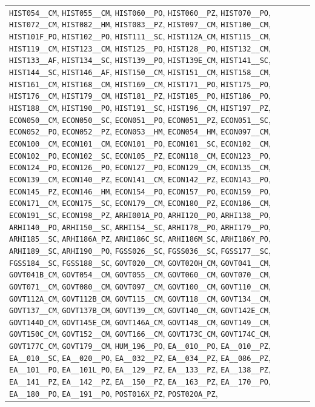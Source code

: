 \begin{longtable}{|p{4.4in}|p{4.4in}|}
\verb|HIST054__CM|, \verb|HIST055__CM|, \verb|HIST060__PO|, \verb|HIST060__PZ|, \verb|HIST070__PO|, \verb|HIST072__CM|, \verb|HIST082__HM|, \verb|HIST083__PZ|, \verb|HIST097__CM|, \verb|HIST100__CM|, \verb|HIST101F_PO|, \verb|HIST102__PO|, \verb|HIST111__SC|, \verb|HIST112A_CM|, \verb|HIST115__CM|, \verb|HIST119__CM|, \verb|HIST123__CM|, \verb|HIST125__PO|, \verb|HIST128__PO|, \verb|HIST132__CM|, \verb|HIST133__AF|, \verb|HIST134__SC|, \verb|HIST139__PO|, \verb|HIST139E_CM|, \verb|HIST141__SC|, \verb|HIST144__SC|, \verb|HIST146__AF|, \verb|HIST150__CM|, \verb|HIST151__CM|, \verb|HIST158__CM|, \verb|HIST161__CM|, \verb|HIST168__CM|, \verb|HIST169__CM|, \verb|HIST171__PO|, \verb|HIST175__PO|, \verb|HIST176__CM|, \verb|HIST179__CM|, \verb|HIST181__PZ|, \verb|HIST185__PO|, \verb|HIST186__PO|, \verb|HIST188__CM|, \verb|HIST190__PO|, \verb|HIST191__SC|, \verb|HIST196__CM|, \verb|HIST197__PZ|, \verb|ECON050__CM|, \verb|ECON050__SC|, \verb|ECON051__PO|, \verb|ECON051__PZ|, \verb|ECON051__SC|, \verb|ECON052__PO|, \verb|ECON052__PZ|, \verb|ECON053__HM|, \verb|ECON054__HM|, \verb|ECON097__CM|, \verb|ECON100__CM|, \verb|ECON101__CM|, \verb|ECON101__PO|, \verb|ECON101__SC|, \verb|ECON102__CM|, \verb|ECON102__PO|, \verb|ECON102__SC|, \verb|ECON105__PZ|, \verb|ECON118__CM|, \verb|ECON123__PO|, \verb|ECON124__PO|, \verb|ECON126__PO|, \verb|ECON127__PO|, \verb|ECON129__CM|, \verb|ECON135__CM|, \verb|ECON139__CM|, \verb|ECON140__PZ|, \verb|ECON141__CM|, \verb|ECON142__PZ|, \verb|ECON143__PO|, \verb|ECON145__PZ|, \verb|ECON146__HM|, \verb|ECON154__PO|, \verb|ECON157__PO|, \verb|ECON159__PO|, \verb|ECON171__CM|, \verb|ECON175__SC|, \verb|ECON179__CM|, \verb|ECON180__PZ|, \verb|ECON186__CM|, \verb|ECON191__SC|, \verb|ECON198__PZ|, \verb|ARHI001A_PO|, \verb|ARHI120__PO|, \verb|ARHI138__PO|, \verb|ARHI140__PO|, \verb|ARHI150__SC|, \verb|ARHI154__SC|, \verb|ARHI178__PO|, \verb|ARHI179__PO|, \verb|ARHI185__SC|, \verb|ARHI186A_PZ|, \verb|ARHI186C_SC|, \verb|ARHI186M_SC|, \verb|ARHI186Y_PO|, \verb|ARHI189__SC|, \verb|ARHI190__PO|, \verb|FGSS026__SC|, \verb|FGSS036__SC|, \verb|FGSS177__SC|, \verb|FGSS184__SC|, \verb|FGSS188__SC|, \verb|GOVT020__CM|, \verb|GOVT020H_CM|, \verb|GOVT041__CM|, \verb|GOVT041B_CM|, \verb|GOVT054__CM|, \verb|GOVT055__CM|, \verb|GOVT060__CM|, \verb|GOVT070__CM|, \verb|GOVT071__CM|, \verb|GOVT080__CM|, \verb|GOVT097__CM|, \verb|GOVT100__CM|, \verb|GOVT110__CM|, \verb|GOVT112A_CM|, \verb|GOVT112B_CM|, \verb|GOVT115__CM|, \verb|GOVT118__CM|, \verb|GOVT134__CM|, \verb|GOVT137__CM|, \verb|GOVT137B_CM|, \verb|GOVT139__CM|, \verb|GOVT140__CM|, \verb|GOVT142E_CM|, \verb|GOVT144D_CM|, \verb|GOVT145E_CM|, \verb|GOVT146A_CM|, \verb|GOVT148__CM|, \verb|GOVT149__CM|, \verb|GOVT150C_CM|, \verb|GOVT152__CM|, \verb|GOVT166__CM|, \verb|GOVT173C_CM|, \verb|GOVT174C_CM|, \verb|GOVT177C_CM|, \verb|GOVT179__CM|, \verb|HUM_196__PO|, \verb|EA__010__PO|, \verb|EA__010__PZ|, \verb|EA__010__SC|, \verb|EA__020__PO|, \verb|EA__032__PZ|, \verb|EA__034__PZ|, \verb|EA__086__PZ|, \verb|EA__101__PO|, \verb|EA__101L_PO|, \verb|EA__129__PZ|, \verb|EA__133__PZ|, \verb|EA__138__PZ|, \verb|EA__141__PZ|, \verb|EA__142__PZ|, \verb|EA__150__PZ|, \verb|EA__163__PZ|, \verb|EA__170__PO|, \verb|EA__180__PO|, \verb|EA__191__PO|, \verb|POST016X_PZ|, \verb|POST020A_PZ|, 
\end{longtable}

